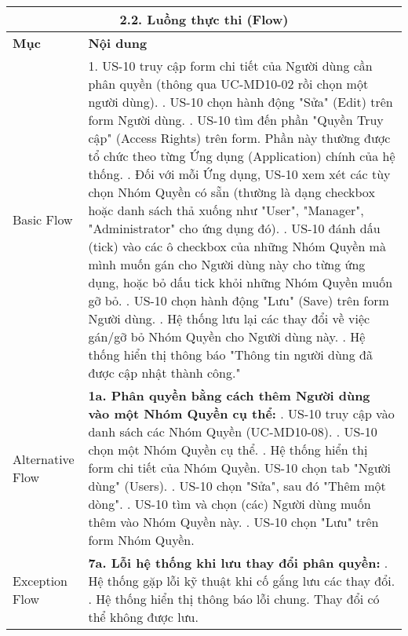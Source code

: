 \begin{longtable}{|m{4cm}|p{11cm}|}
\hline
\multicolumn{2}{|c|}{\textbf{2.2. Luồng thực thi (Flow)}} \\
\hline
\textbf{Mục} & \textbf{Nội dung} \\
\hline
Basic Flow & 1. US-10 truy cập form chi tiết của Người dùng cần phân quyền (thông qua UC-MD10-02 rồi chọn một người dùng). \newline 2. US-10 chọn hành động "Sửa" (Edit) trên form Người dùng. \newline 3. US-10 tìm đến phần "Quyền Truy cập" (Access Rights) trên form. Phần này thường được tổ chức theo từng Ứng dụng (Application) chính của hệ thống. \newline 4. Đối với mỗi Ứng dụng, US-10 xem xét các tùy chọn Nhóm Quyền có sẵn (thường là dạng checkbox hoặc danh sách thả xuống như "User", "Manager", "Administrator" cho ứng dụng đó). \newline 5. US-10 đánh dấu (tick) vào các ô checkbox của những Nhóm Quyền mà mình muốn gán cho Người dùng này cho từng ứng dụng, hoặc bỏ dấu tick khỏi những Nhóm Quyền muốn gỡ bỏ. \newline 6. US-10 chọn hành động "Lưu" (Save) trên form Người dùng. \newline 7. Hệ thống lưu lại các thay đổi về việc gán/gỡ bỏ Nhóm Quyền cho Người dùng này. \newline 8. Hệ thống hiển thị thông báo "Thông tin người dùng đã được cập nhật thành công." \\
\hline
Alternative Flow & \textbf{1a. Phân quyền bằng cách thêm Người dùng vào một Nhóm Quyền cụ thể:} \newline    1. US-10 truy cập vào danh sách các Nhóm Quyền (UC-MD10-08). \newline    2. US-10 chọn một Nhóm Quyền cụ thể. \newline    3. Hệ thống hiển thị form chi tiết của Nhóm Quyền. US-10 chọn tab "Người dùng" (Users). \newline    4. US-10 chọn "Sửa", sau đó "Thêm một dòng". \newline    5. US-10 tìm và chọn (các) Người dùng muốn thêm vào Nhóm Quyền này. \newline    6. US-10 chọn "Lưu" trên form Nhóm Quyền. \\
\hline
Exception Flow & \textbf{7a. Lỗi hệ thống khi lưu thay đổi phân quyền:} \newline    1. Hệ thống gặp lỗi kỹ thuật khi cố gắng lưu các thay đổi. \newline    2. Hệ thống hiển thị thông báo lỗi chung. Thay đổi có thể không được lưu. \\

\end{longtable}
